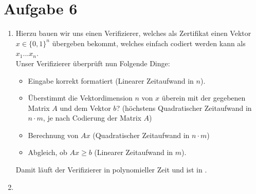 \documentclass[a4paper,11pt]{scrartcl}
\begin{document}
	\section*{Aufgabe 6}
	\begin{enumerate}[label=(\alph*)]
	\item
		Hierzu bauen wir uns einen Verifizierer, welches als Zertifikat einen Vektor $x \in \{0,1\}^n$ übergeben bekommt, welches einfach codiert werden kann als $x_1 ... x_n$.\\
		Unser Verifizierer überprüft nun Folgende Dinge:
		\begin{itemize}
		\item	Eingabe korrekt formatiert (Linearer Zeitaufwand in $n$).
		\item	Überstimmt die Vektordimension $n$ von $x$ überein mit der gegebenen Matrix $A$ und dem Vektor $b$? (höchstens Quadratischer Zeitaufwand in $n \cdot m$, je nach Codierung der Matrix $A$)
		\item	Berechnung von $Ax$ (Quadratischer Zeitaufwand in $n \cdot m$)
		\item	Abgleich, ob $Ax \geq b$ (Linearer Zeitaufwand in $m$).
		\end{itemize}
		Damit läuft der Verifizierer in polynomieller Zeit und  ist in .
		
	\item 
	\end{enumerate}
	
\end{document}
